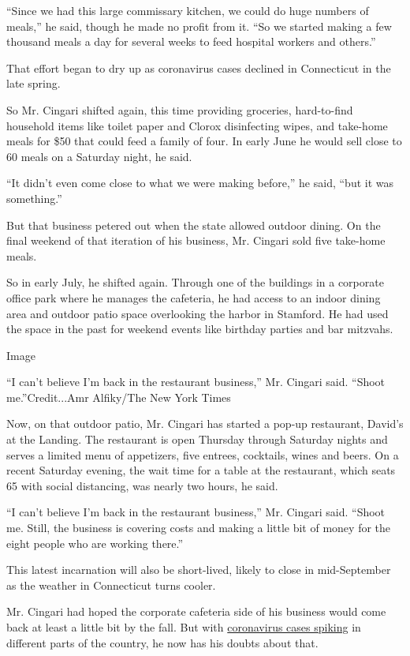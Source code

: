 ``Since we had this large commissary kitchen, we could do huge numbers
of meals,'' he said, though he made no profit from it. ``So we started
making a few thousand meals a day for several weeks to feed hospital
workers and others.''

That effort began to dry up as coronavirus cases declined in Connecticut
in the late spring.

So Mr. Cingari shifted again, this time providing groceries,
hard-to-find household items like toilet paper and Clorox disinfecting
wipes, and take-home meals for \$50 that could feed a family of four. In
early June he would sell close to 60 meals on a Saturday night, he said.

``It didn't even come close to what we were making before,'' he said,
``but it was something.''

But that business petered out when the state allowed outdoor dining. On
the final weekend of that iteration of his business, Mr. Cingari sold
five take-home meals.

So in early July, he shifted again. Through one of the buildings in a
corporate office park where he manages the cafeteria, he had access to
an indoor dining area and outdoor patio space overlooking the harbor in
Stamford. He had used the space in the past for weekend events like
birthday parties and bar mitzvahs.

Image

``I can't believe I'm back in the restaurant business,'' Mr. Cingari
said. ``Shoot me.''Credit...Amr Alfiky/The New York Times

Now, on that outdoor patio, Mr. Cingari has started a pop-up restaurant,
David's at the Landing. The restaurant is open Thursday through Saturday
nights and serves a limited menu of appetizers, five entrees, cocktails,
wines and beers. On a recent Saturday evening, the wait time for a table
at the restaurant, which seats 65 with social distancing, was nearly two
hours, he said.

``I can't believe I'm back in the restaurant business,'' Mr. Cingari
said. ``Shoot me. Still, the business is covering costs and making a
little bit of money for the eight people who are working there.''

This latest incarnation will also be short-lived, likely to close in
mid-September as the weather in Connecticut turns cooler.

Mr. Cingari had hoped the corporate cafeteria side of his business would
come back at least a little bit by the fall. But with
\href{https://www.nytimes3xbfgragh.onion/interactive/2020/us/coronavirus-us-cases.html}{coronavirus
cases spiking} in different parts of the country, he now has his doubts
about that.

